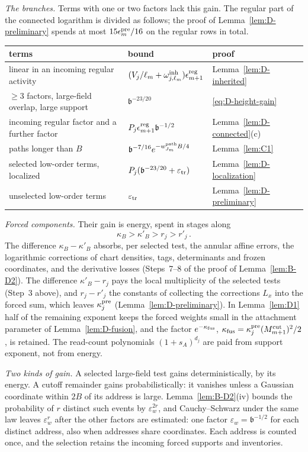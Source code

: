 \emph{The branches.} Terms with one or two factors lack this gain. The regular part of the connected logarithm is divided as follows; the proof of Lemma~\ref{lem:D-preliminary} spends at most $15\epsilon^{\rm pre}_m/16$ on the regular rows in total.
\begin{center}\small
\begin{tabular}{l|l|l}
terms & bound & proof\\\hline
linear in an incoming regular activity & $(V_j/\ell_m+\omega^{\rm inh}_{j,\ell_m})\epsilon^{\rm reg}_{m+1}$ & Lemma~\ref{lem:D-inherited}\\
$\ge3$ factors, large-field overlap, large support & $\mathfrak b^{-23/20}$ & \eqref{eq:D-height-gain}\\
incoming regular factor and a further factor & $P_j\epsilon^{\rm reg}_{m+1}\mathfrak b^{-1/2}$ & Lemma~\ref{lem:D-connected}(c)\\
paths longer than $B$ & $\mathfrak b^{-7/16}e^{-w^{\rm path}_{J_m}B/4}$ & Lemma~\ref{lem:C1}\\
selected low-order terms, localized & $P_j(\mathfrak b^{-23/20}+\varepsilon_{\rm tr})$ & Lemma~\ref{lem:D-localization}\\
unselected low-order terms & $\varepsilon_{\rm tr}$ & Lemma~\ref{lem:D-preliminary}
\end{tabular}
\end{center}

\emph{Forced components.} Their gain is energy, spent in stages along
\begin{equation*}
\kappa_B>\kappa'_B>r_j>r'_j\,.
\end{equation*}
The difference $\kappa_B-\kappa'_B$ absorbs, per selected test, the annular affine errors, the logarithmic corrections of chart densities, tags, determinants and frozen coordinates, and the derivative losses (Steps~7--8 of the proof of Lemma~\ref{lem:B-D2}). The difference $\kappa'_B-r_j$ pays the local multiplicity of the selected tests (Step~3 above), and $r_j-r'_j$ the constants of collecting the corrections $L_x$ into the forced sum, which leaves $\kappa_j^{\rm pre}$ (Lemma~\ref{lem:D-preliminary}). In Lemma~\ref{lem:D1} half of the remaining exponent keeps the forced weights small in the attachment parameter of Lemma~\ref{lem:D-fusion}, and the factor $e^{-\kappa_{\rm fus}}$, $\kappa_{\rm fus}=\kappa_j^{\rm pre}(M^{\mathrm{cut}}_{m+1})^2/2$, is retained. The read-count polynomials $(1+s_A)^{d_j}$ are paid from support exponent, not from energy.

\emph{Two kinds of gain.} A selected large-field test gains deterministically, by its energy. A cutoff remainder gains probabilistically: it vanishes unless a Gaussian coordinate within $2B$ of its address is large. Lemma~\ref{lem:B-D2}(iv) bounds the probability of $r$ distinct such events by $\varepsilon_w^{2r}$, and Cauchy--Schwarz under the same law leaves $\varepsilon_w^r$ after the other factors are estimated: one factor $\varepsilon_w=\mathfrak b^{-1/2}$ for each distinct address, also when addresses share coordinates. Each address is counted once, and the selection retains the incoming forced supports and inventories.

